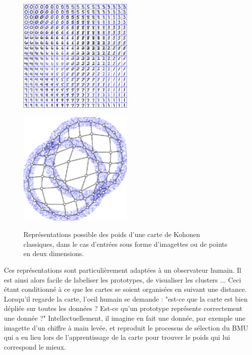 \begin{figure}
\begin{minipage}{0.5\textwidth}
\centering
\includegraphics[width=0.5\textwidth]{digits.jpg}
\label{fig:digits}
\end{minipage}
\begin{minipage}{0.5\textwidth}
\centering
\includegraphics[width=0.5\textwidth]{points.png}
\label{fig:points2D}
\end{minipage}
\caption{Représentations possible des poids d'une carte de Kohonen classiques, dans le cas d'entrées sous forme d'imagettes ou de points en deux dimensions.}
\end{figure}

Ces représentations sont particulièrement adaptées à un observateur humain. Il est ainsi alors facile de labeliser les prototypes, de visualiser les clusters ... Ceci étant conditionné à ce que les cartes se soient organisées en suivant une distance. Lorsqu'il regarde la carte, l'oeil humain se demande : "est-ce que la carte est bien dépliée sur toutes les données ? Est-ce qu'un prototype représente correctement une donnée ?" Intellectuellement, il imagine en fait une donnée, par exemple une imagette d'un chiffre à main levée, et reproduit le processus de sélection du BMU qui a eu lieu lors de l'apprentissage de la carte pour trouver le poids qui lui correspond le mieux. 

